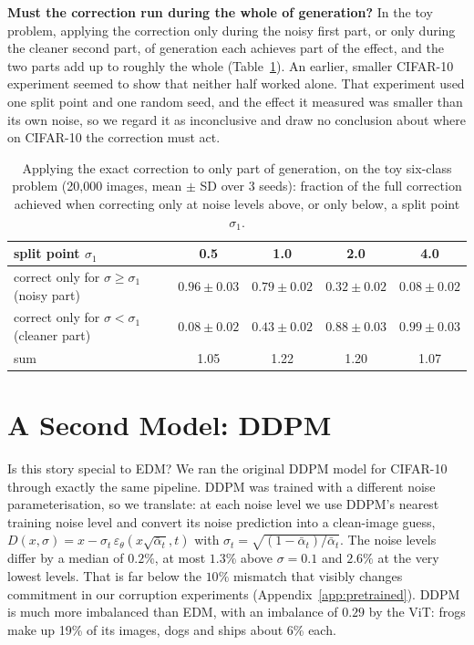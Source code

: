 \documentclass[11pt]{article}
\newcommand{\para}[1]{\textbf{#1}\hspace{0.6em}}
\begin{document}
\para{Must the correction run during the whole of generation?}
In the toy problem, applying the correction only during the noisy first part, or only during the cleaner second part, of generation each achieves part of the effect, and the two parts add up to roughly the whole (Table~\ref{tab:bands}). An earlier, smaller CIFAR-10 experiment seemed to show that neither half worked alone. That experiment used one split point and one random seed, and the effect it measured was smaller than its own noise, so we regard it as inconclusive and draw no conclusion about where on CIFAR-10 the correction must act.

\begin{table}[t]
\centering
\caption{Applying the exact correction to only part of generation, on the toy six-class problem (20{,}000 images, mean $\pm$ SD over 3 seeds): fraction of the full correction achieved when correcting only at noise levels above, or only below, a split point $\sigma_1$.}
\label{tab:bands}
\small
\begin{tabular}{lcccc}
\toprule
split point $\sigma_1$ & 0.5 & 1.0 & 2.0 & 4.0 \\
\midrule
correct only for $\sigma\ge\sigma_1$ (noisy part) & $0.96\pm0.03$ & $0.79\pm0.02$ & $0.32\pm0.02$ & $0.08\pm0.02$ \\
correct only for $\sigma<\sigma_1$ (cleaner part) & $0.08\pm0.02$ & $0.43\pm0.02$ & $0.88\pm0.03$ & $0.99\pm0.03$ \\
sum & 1.05 & 1.22 & 1.20 & 1.07 \\
\bottomrule
\end{tabular}
\end{table}

\section{A Second Model: DDPM}
\label{sec:ddpm}

Is this story special to EDM? We ran the original DDPM model for CIFAR-10 \citep{ho2020denoising} through exactly the same pipeline. DDPM was trained with a different noise parameterisation, so we translate: at each noise level we use DDPM's nearest training noise level and convert its noise prediction into a clean-image guess, $D(x,\sigma)=x-\sigma_t\,\varepsilon_\theta(x\sqrt{\bar\alpha_t},t)$ with $\sigma_t=\sqrt{(1-\bar\alpha_t)/\bar\alpha_t}$. The noise levels differ by a median of $0.2\%$, at most $1.3\%$ above $\sigma=0.1$ and $2.6\%$ at the very lowest levels. That is far below the $10\%$ mismatch that visibly changes commitment in our corruption experiments (Appendix~\ref{app:pretrained}). DDPM is much more imbalanced than EDM, with an imbalance of $0.29$ by the ViT: frogs make up 19\% of its images, dogs and ships about 6\% each.
\end{document}
